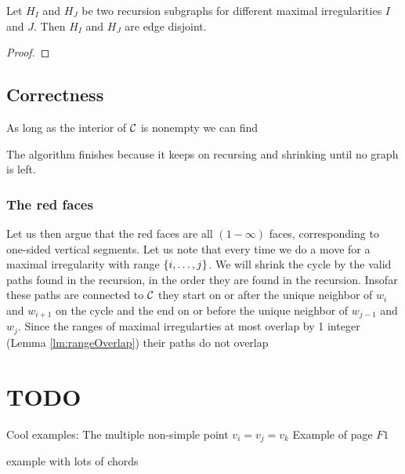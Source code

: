 \begin{lemma}
Let $H_I$ and $H_J$ be two recursion subgraphs for different maximal irregularities $I$ and $J$. Then $H_I$ and $H_J$ are edge disjoint.
\end{lemma}
\begin{proof}
\end{proof}


\subsection{Correctness}
As long as the interior of $\mathcal{C}$ is nonempty we can find 

The algorithm finishes because it keeps on recursing and shrinking until no graph is left.

\subsubsection{The red faces}
Let us then argue that the red faces are all $(1-\infty)$ faces, corresponding to one-sided vertical segments.
Let us note that every time we do a move for a maximal irregularity with range $\left\lbrace {i, \ldots, j} \right\rbrace$. We will shrink the cycle by the valid paths found in the recursion, in the order they are found in the recursion. Insofar these paths are connected to $\mathcal{C}$ they start on or after the unique neighbor of $w_i$ and $w_{i+1}$ on the cycle and the end on or before the unique neighbor of $w_{j-1}$ and $w_j$. Since the ranges of maximal irregularties at most overlap by 1 integer (Lemma \ref{lm:rangeOverlap}) their paths do not overlap


\section{TODO}
Cool examples: The multiple non-simple point $v_i = v_j =v_k$
Example of page $F1$

example with lots of chords

